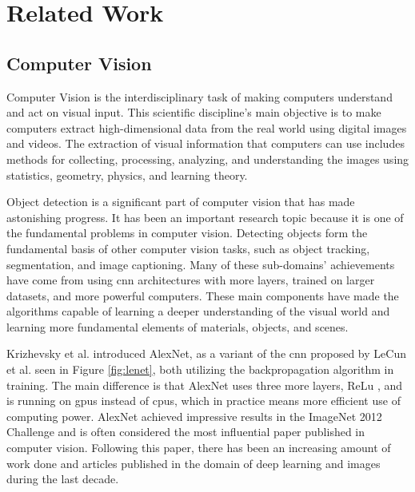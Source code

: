 \label{sec:2_related_work}
\section{Related Work} 

\subsection{Computer Vision}
Computer Vision is the interdisciplinary task of making computers understand and act on visual input. This scientific discipline's main objective is to make computers extract high-dimensional data from the real world using digital images and videos. The extraction of visual information that computers can use includes methods for collecting, processing, analyzing, and understanding the images using statistics, geometry, physics, and learning theory. 

Object detection is a significant part of computer vision that has made astonishing progress. It has been an important research topic because it is one of the fundamental problems in computer vision. Detecting objects form the fundamental basis of other computer vision tasks, such as object tracking, segmentation, and image captioning. Many of these sub-domains' achievements have come from using \gls{cnn} architectures with more layers, trained on larger datasets, and more powerful computers. These main components have made the algorithms capable of learning a deeper understanding of the visual world and learning more fundamental elements of materials, objects, and scenes.  

Krizhevsky et al. introduced AlexNet\cite{krizhevskyImageNetClassificationDeep2017}, as a variant of the \gls{cnn} proposed by LeCun et al.\cite{lecunHandwrittenDigitRecognition1989, lecunGradientbasedLearningApplied1998} seen in Figure \ref{fig:lenet}, both utilizing the backpropagation algorithm \cite{rumelhartLearningRepresentationsBackpropagating1986}
in training. The main difference is that AlexNet uses three more layers, ReLu \cite{fukushimaCognitronSelforganizingMultilayered1975}
, and is running on \glspl{gpu} instead of \glspl{cpu}, which in practice means more efficient use of computing power.
AlexNet achieved impressive results in the ImageNet \cite{dengImageNetLargeScaleHierarchical2009} 2012 Challenge and is often considered the most influential paper published in computer vision. 
Following this paper, there has been an increasing amount of work done and articles published in the domain of deep learning and images during the last decade.

